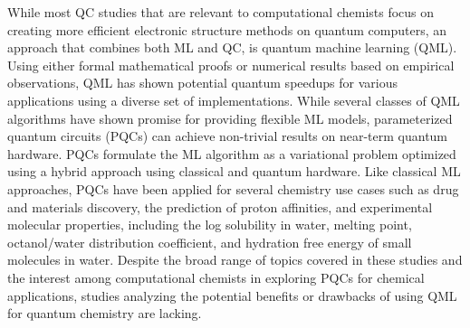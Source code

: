 \documentclass[journal=jacsat,manuscript=article]{achemso}
\begin{document}
While most QC studies that are relevant to computational chemists focus on creating more efficient electronic structure methods on quantum computers\cite{romero_strategies_2019,mcardle_quantum_2020,bauer_quantum_2020,cao_quantum_2019}, an approach that combines both ML and QC, is quantum machine learning (QML).
Using either formal mathematical proofs or numerical results based on empirical observations, QML has shown potential quantum speedups for various applications using a diverse set of implementations.\cite{biamonte_quantum_2017}
While several classes of QML algorithms have shown promise for providing flexible ML models, parameterized quantum circuits (PQCs) can achieve non-trivial results on near-term quantum hardware.
PQCs formulate the ML algorithm as a variational problem optimized using a hybrid approach using classical and quantum hardware.\cite{benedetti_parameterized_2019}
Like classical ML approaches, PQCs have been applied for several chemistry use cases such as drug\cite{suzuki_predicting_2020,smaldone_quantum--classical_2024,bhatia_quantum_2023,kao_exploring_2023,li_quantum_2021,avramouli_quantum_2023,avramouli_unlocking_2023} and materials discovery\cite{ishiyama_noise-robust_2022,ryu_quantum_2023,vitz_hybrid_2024}, the prediction of proton affinities\cite{jin_integrating_2025}, and experimental molecular properties, including the log solubility in water, melting point, octanol/water distribution coefficient, and hydration free energy of small molecules in water.\cite{hatakeyama-sato_quantum_2023}
Despite the broad range of topics covered in these studies and the interest among computational chemists in exploring PQCs for chemical applications, studies analyzing the potential benefits or drawbacks of using QML for quantum chemistry are lacking. 
\end{document}

